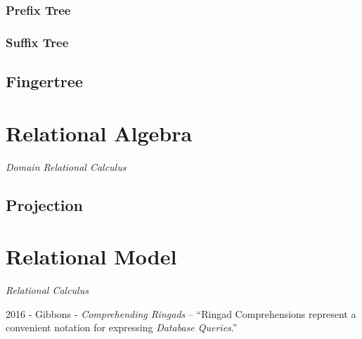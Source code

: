 \subsubsection{Prefix Tree}\label{sec:prefix_tree}

\subsubsection{Suffix Tree}\label{sec:suffix_tree}



\subsection{Fingertree}\label{sec:fingertree}



\section{Relational Algebra}\label{sec:relational_algebra}

\emph{Domain Relational Calculus}



\subsection{Projection}\label{sec:relational_projection}



\section{Relational Model}\label{sec:relational_model}

\emph{Relational Calculus}


2016 - Gibbons - \emph{Comprehending Ringads} -- ``Ringad Comprehensions
represent a convenient notation for expressing \emph{Database Queries}.''




